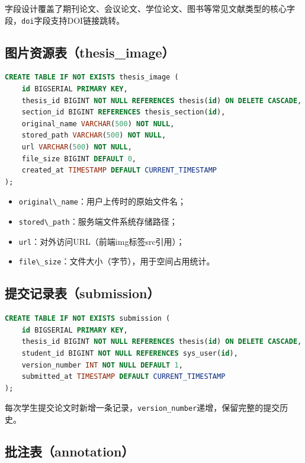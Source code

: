 \documentclass{../../softeng}
\begin{document}
字段设计覆盖了期刊论文、会议论文、学位论文、图书等常见文献类型的核心字段，\verb|doi|字段支持DOI链接跳转。

\subsection{图片资源表（thesis\_image）}

\begin{lstlisting}[language=SQL,caption={thesis\_image 建表语句}]
CREATE TABLE IF NOT EXISTS thesis_image (
    id BIGSERIAL PRIMARY KEY,
    thesis_id BIGINT NOT NULL REFERENCES thesis(id) ON DELETE CASCADE,
    section_id BIGINT REFERENCES thesis_section(id),
    original_name VARCHAR(500) NOT NULL,
    stored_path VARCHAR(500) NOT NULL,
    url VARCHAR(500) NOT NULL,
    file_size BIGINT DEFAULT 0,
    created_at TIMESTAMP DEFAULT CURRENT_TIMESTAMP
);
\end{lstlisting}

\begin{itemize}
    \item \verb|original\_name|：用户上传时的原始文件名；
    \item \verb|stored\_path|：服务端文件系统存储路径；
    \item \verb|url|：对外访问URL（前端img标签src引用）；
    \item \verb|file\_size|：文件大小（字节），用于空间占用统计。
\end{itemize}

\subsection{提交记录表（submission）}

\begin{lstlisting}[language=SQL,caption={submission 建表语句}]
CREATE TABLE IF NOT EXISTS submission (
    id BIGSERIAL PRIMARY KEY,
    thesis_id BIGINT NOT NULL REFERENCES thesis(id) ON DELETE CASCADE,
    student_id BIGINT NOT NULL REFERENCES sys_user(id),
    version_number INT NOT NULL DEFAULT 1,
    submitted_at TIMESTAMP DEFAULT CURRENT_TIMESTAMP
);
\end{lstlisting}

每次学生提交论文时新增一条记录，\verb|version_number|递增，保留完整的提交历史。

\subsection{批注表（annotation）}
\end{document}
